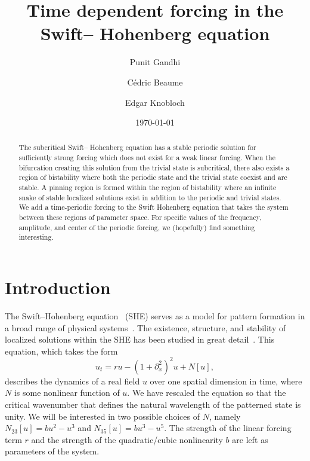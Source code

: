 \documentclass[pre,preprint,superscriptaddress]{revtex4-1}
\begin{document}
\title{Time dependent forcing in the Swift-- Hohenberg equation}
\author{Punit Gandhi}
\author{C\'edric Beaume}
\author{Edgar Knobloch}
\date{\today}

\begin{abstract}
The subcritical Swift-- Hohenberg equation has a stable periodic solution for sufficiently strong forcing which does not exist for a weak linear forcing.  When the bifurcation creating this solution from the trivial state is subcritical, there also exists a region of bistability where both the periodic state and the trivial state coexist and are stable.  A pinning region is formed within the region of bistability where an infinite snake of stable localized solutions exist in addition to the periodic and trivial states.   We add a time-periodic forcing to the Swift Hohenberg equation that takes the system between these regions of parameter space.  For specific values of the frequency, amplitude, and center of the periodic forcing, we (hopefully) find something interesting.
\end{abstract}

\maketitle

\section{Introduction}
The Swift--Hohenberg equation~\cite{swift1977} (SHE) serves as a model for pattern formation in a broad range of physical systems~\cite{}.  The existence, structure, and stability of localized solutions within the SHE has been studied in great detail~\cite{burke2006,burke2007snakes,burke2007stability}.   This equation, which takes the form  
\begin{equation}
u_t= r u-\left(1+\partial_{x}^2\right)^2u+N[u]\label{eq:SH},
\end{equation}
describes the dynamics of a real field $u$ over one spatial dimension in time, where $N$ is some nonlinear function of $u$.  We have rescaled the equation so that the critical wavenumber that defines the natural wavelength of the patterned state is unity.  We will be interested in two possible choices of $N$, namely $N_{23}[u]=bu^2-u^3$ and $N_{35}[u]=b u^3-u^5$.  The strength of the linear forcing term $r$ and the strength of the quadratic/cubic nonlinearity $b$ are left as parameters of the system.  
\end{document}
